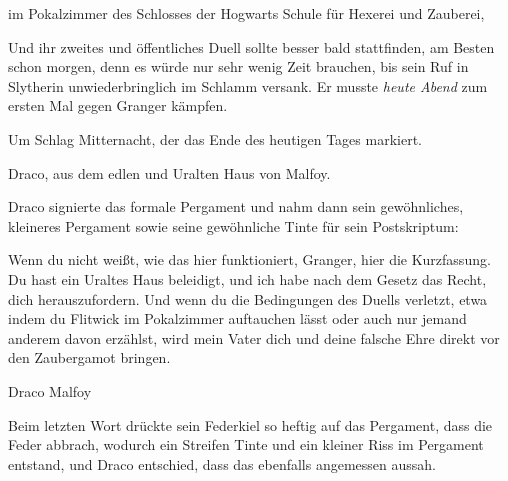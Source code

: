 \begin{writtenNote}
im Pokalzimmer des Schlosses der Hogwarts Schule für Hexerei und Zauberei,
\end{writtenNote}

Und ihr zweites und öffentliches Duell sollte besser bald stattfinden, am Besten schon morgen, denn es würde nur sehr wenig Zeit brauchen, bis sein Ruf in Slytherin unwiederbringlich im Schlamm versank. Er musste \emph{heute Abend} zum ersten Mal gegen Granger kämpfen.

\begin{writtenNote}
Um Schlag Mitternacht, der das Ende des heutigen Tages markiert.

Draco, aus dem edlen und Uralten Haus von Malfoy.
\end{writtenNote}

Draco signierte das formale Pergament und nahm dann sein gewöhnliches, kleineres Pergament sowie seine gewöhnliche Tinte für sein Postskriptum:

\begin{writtenNote}
Wenn du nicht weißt, wie das hier funktioniert, Granger, hier die Kurzfassung. Du hast ein Uraltes Haus beleidigt, und ich habe nach dem Gesetz das Recht, dich herauszufordern. Und wenn du die Bedingungen des Duells verletzt, etwa indem du Flitwick im Pokalzimmer auftauchen lässt oder auch nur jemand anderem davon erzählst, wird mein Vater dich und deine falsche Ehre direkt vor den Zaubergamot bringen.

Draco Malfoy
\end{writtenNote}

Beim letzten Wort drückte sein Federkiel so heftig auf das Pergament, dass die Feder abbrach, wodurch ein Streifen Tinte und ein kleiner Riss im Pergament entstand, und Draco entschied, dass das ebenfalls angemessen aussah.

